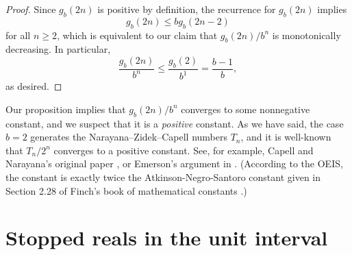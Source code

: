 \documentclass[12pt]{amsart}
\newcommand{\Z}{\mathbb{Z}}
\theoremstyle{definition}
\begin{document}
\begin{proof}
    Since $g_b(2n)$ is positive by definition, the recurrence for $g_b(2n)$
    implies
    \begin{equation*}
        g_b(2n) \leq b g_b(2n - 2)
    \end{equation*}
    for all $n \geq 2$, which is equivalent to our claim that $g_b(2n) / b^n$
    is monotonically decreasing. In particular,
    \begin{equation*}
        \frac{g_b(2n)}{b^n} \leq \frac{g_b(2)}{b^1} = \frac{b - 1}{b},
    \end{equation*}
    as desired.
\end{proof}

Our proposition implies that $g_b(2n) / b^n$ converges to some nonnegative
constant, and we suspect that it is a \emph{positive} constant. As we have
said, the case $b = 2$ generates the Narayana--Zidek--Capell numbers $T_n$, and
it is well-known that $T_n / 2^n$ converges to a positive constant. See, for
example, Capell and Narayana's original paper \cite{capell1970knock}, or
Emerson's argument in \cite{emerson2006family}. (According to the OEIS, the
constant is exactly twice the Atkinson-Negro-Santoro constant given in Section
2.28 of Finch's book of mathematical constants \cite{finch2003mathematical}.)

\section{Stopped reals in the unit interval}
\label{sec:reals}



\end{document}
